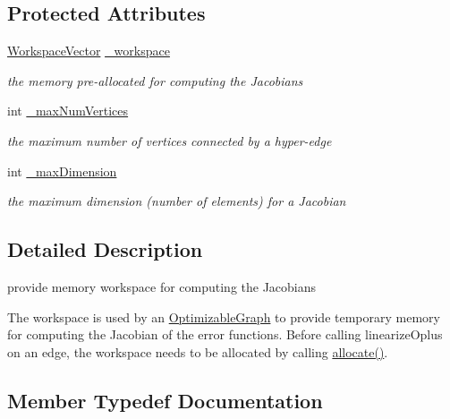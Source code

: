 \subsection*{Protected Attributes}
\begin{DoxyCompactItemize}
\item 
\mbox{\hyperlink{classg2o_1_1_jacobian_workspace_aee9d767fa1208772a3de83732646e182}{Workspace\+Vector}} \mbox{\hyperlink{classg2o_1_1_jacobian_workspace_af7dbaa3a651808e1bf3f876896bd1bfc}{\+\_\+workspace}}
\begin{DoxyCompactList}\small\item\em the memory pre-\/allocated for computing the Jacobians \end{DoxyCompactList}\item 
int \mbox{\hyperlink{classg2o_1_1_jacobian_workspace_a640c84c19a739ce3116fc02c3a66b096}{\+\_\+max\+Num\+Vertices}}
\begin{DoxyCompactList}\small\item\em the maximum number of vertices connected by a hyper-\/edge \end{DoxyCompactList}\item 
int \mbox{\hyperlink{classg2o_1_1_jacobian_workspace_aa6cd4fb8bc1bb4fe9ada55d9feefc817}{\+\_\+max\+Dimension}}
\begin{DoxyCompactList}\small\item\em the maximum dimension (number of elements) for a Jacobian \end{DoxyCompactList}\end{DoxyCompactItemize}


\subsection{Detailed Description}
provide memory workspace for computing the Jacobians 

The workspace is used by an \mbox{\hyperlink{structg2o_1_1_optimizable_graph}{Optimizable\+Graph}} to provide temporary memory for computing the Jacobian of the error functions. Before calling linearize\+Oplus on an edge, the workspace needs to be allocated by calling \mbox{\hyperlink{classg2o_1_1_jacobian_workspace_a8e1d23ced91b721fdb5bd68c8c4e9fc3}{allocate()}}. 

\subsection{Member Typedef Documentation}
\mbox{\label{classg2o_1_1_jacobian_workspace_aee9d767fa1208772a3de83732646e182}} 

